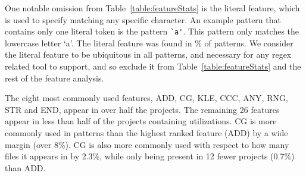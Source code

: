 One notable omission from Table~\ref{table:featureStats} is the literal feature, which is used  to specify matching any specific character.  An example pattern that contains only one literal token is the pattern \verb!`a'!.  This pattern only matches the lowercase letter `a'.  The literal feature was found in \% of patterns.
We consider the literal feature to be ubiquitous in all patterns, and necessary for any regex related tool to support, and so exclude it from Table~\ref{table:featureStats} and the rest of the feature analysis.



The eight most commonly used features, ADD, CG, KLE, CCC, ANY, RNG, STR and END,
appear in over half the projects. The remaining 26 features appear in less than half of the projects containing utilizations.
CG is more commonly used in patterns than the highest ranked feature (ADD) by a wide margin (over 8\%).  CG is also more commonly used with respect to how many files it appears in by 2.3\%, while only being present in 12 fewer projects (0.7\%) than ADD.







